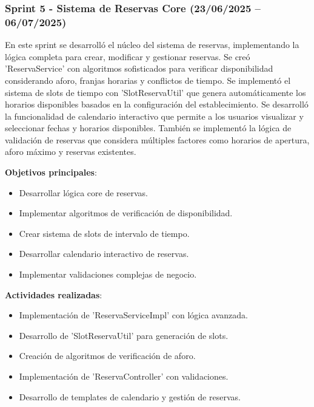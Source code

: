 \subsubsection{Sprint 5 - Sistema de Reservas Core (23/06/2025 – 06/07/2025)} 
En este sprint se desarrolló el núcleo del sistema de reservas, implementando la lógica completa para crear, modificar y gestionar reservas. Se creó 'ReservaService' con algoritmos sofisticados para verificar disponibilidad considerando aforo, franjas horarias y conflictos de tiempo. Se implementó el sistema de slots de tiempo con 'SlotReservaUtil' que genera automáticamente los horarios disponibles basados en la configuración del establecimiento. Se desarrolló la funcionalidad de calendario interactivo que permite a los usuarios visualizar y seleccionar fechas y horarios disponibles. También se implementó la lógica de validación de reservas que considera múltiples factores como horarios de apertura, aforo máximo y reservas existentes.

\textbf{Objetivos principales}:
\begin{itemize}
\tightlist
\item
Desarrollar lógica core de reservas.
\item
Implementar algoritmos de verificación de disponibilidad.
\item
Crear sistema de slots de intervalo de tiempo.
\item
Desarrollar calendario interactivo de reservas.
\item
Implementar validaciones complejas de negocio.
\end{itemize}

\textbf{Actividades realizadas}:
\begin{itemize}
\tightlist
\item
Implementación de 'ReservaServiceImpl' con lógica avanzada.
\item
Desarrollo de 'SlotReservaUtil' para generación de slots.
\item
Creación de algoritmos de verificación de aforo.
\item
Implementación de 'ReservaController' con validaciones.
\item
Desarrollo de templates de calendario y gestión de reservas.
\end{itemize}

